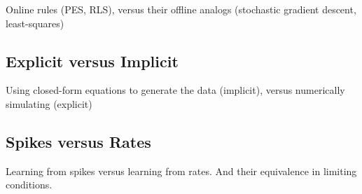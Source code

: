 Online rules (PES, RLS), versus their offline analogs (stochastic gradient descent, least-squares)

\subsection{Explicit versus Implicit}

Using closed-form equations to generate the data (implicit), versus numerically simulating (explicit)

\subsection{Spikes versus Rates}

Learning from spikes versus learning from rates. And their equivalence in limiting conditions.


